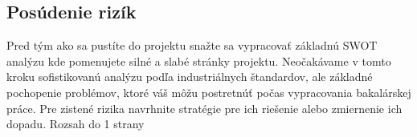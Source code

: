 \subsection{Posúdenie rizík}
Pred tým ako sa pustíte do projektu snažte sa vypracovať základnú SWOT analýzu kde pomenujete silné a slabé stránky projektu. Neočakávame v tomto kroku sofistikovanú analýzu podľa industriálnych štandardov, ale základné pochopenie problémov, ktoré váš môžu postretnúť počas vypracovania bakalárskej práce. Pre zistené rizika navrhnite stratégie pre ich riešenie alebo zmiernenie ich dopadu. Rozsah do 1 strany


